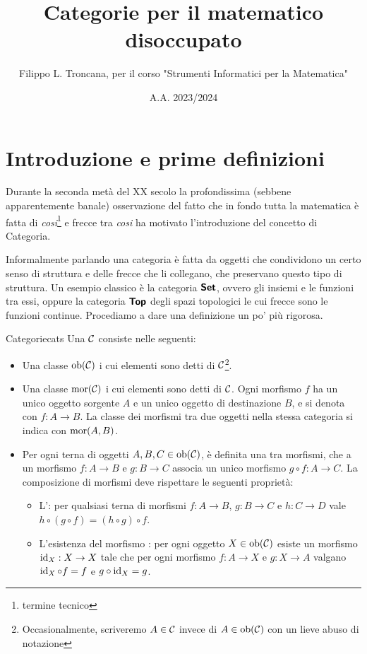 \documentclass{article}
\title{Categorie per il matematico disoccupato}
\author{Filippo L. Troncana, per il corso "Strumenti Informatici per la Matematica"}
\date{A.A. 2023/2024}
\begin{document}
\nocite{*}
\maketitle

\section{Introduzione e prime definizioni}
\label{sec:Intro}

Durante la seconda metà del XX secolo la profondissima (sebbene apparentemente banale) osservazione del fatto che in fondo tutta la matematica è fatta di \textit{cosi}\footnote{termine tecnico} e frecce tra \textit{cosi} ha motivato l'introduzione del concetto di Categoria.

Informalmente parlando una categoria è fatta da oggetti che condividono un certo senso di struttura e delle frecce che li collegano, che preservano questo tipo di struttura. Un esempio classico è la categoria $\text{\sffamily\textbf{Set}}$, ovvero gli insiemi e le funzioni tra essi, oppure la categoria $\text{\sffamily\textbf{Top}}$ degli spazi topologici le cui frecce sono le funzioni continue. Procediamo a dare una definizione un po' più rigorosa.

\begin{definition}{Categorie}{cats}
    Una  $\mathcal{C}$ consiste nelle seguenti:
    \begin{itemize}
        \item Una classe $\operatorname{ob}(\mathcal{C})$ i cui elementi sono detti  di $\mathcal{C}$\footnote{Occasionalmente, scriveremo $A\in \mathcal{C}$ invece di $A \in \operatorname{ob}(\mathcal{C})$ con un lieve abuso di notazione}.
        \item Una classe $\operatorname{mor}(\mathcal{C})$ i cui elementi sono detti  di $\mathcal{C}$. Ogni morfismo $f$ ha un unico oggetto sorgente $A$ e un unico oggetto di destinazione $B$, e si denota con $f:A\to B$. La classe dei morfismi tra due oggetti nella stessa categoria si indica con $\operatorname{mor}(A,B)$.
        \item Per ogni terna di oggetti $A,B,C \in \operatorname{ob}(\mathcal{C})$, è definita una  tra morfismi, che a un morfismo $f : A \to B$ e $g: B \to C$ associa un unico morfismo $g \circ f : A \to C$. La composizione di morfismi deve rispettare le seguenti proprietà:
        \begin{itemize}
            \item L': per qualsiasi terna di morfismi $f: A\to B$, $g: B\to C$ e $h:C \to D$ vale $h \circ (g \circ f) = (h \circ g) \circ f$.
            \item L'esistenza del morfismo : per ogni oggetto $X \in \operatorname{ob}(\mathcal{C})$ esiste un morfismo $\operatorname{id}_{X} : X \to X$ tale che per ogni morfismo $f:A \to X$ e $g: X \to A$ valgano $\operatorname{id}_{X} \circ f = f$ e $g \circ \operatorname{id}_{X} = g$.
        \end{itemize}
    \end{itemize}
\end{definition}
\end{document}

